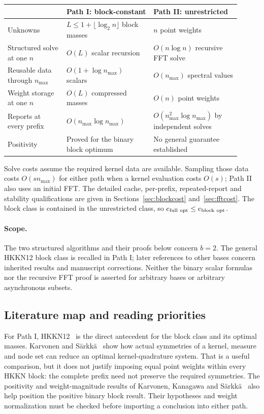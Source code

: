 \documentclass[11pt]{article}
\begin{document}
\begin{center}\small
\begin{tabular}{@{}>{\raggedright\arraybackslash}p{0.23\linewidth}
                  >{\raggedright\arraybackslash}p{0.34\linewidth}
                  >{\raggedright\arraybackslash}p{0.34\linewidth}@{}}
\toprule
 & \textbf{Path I: block-constant} & \textbf{Path II: unrestricted} \\
\midrule
Unknowns & $L\le1+\lfloor\log_2n\rfloor$ block masses & $n$ point weights \\
Structured solve at one $n$ & $O(L)$ scalar recursion & $O(n\log n)$ recursive FFT solve \\
Reusable data through $n_{\max}$ & $O(1+\log n_{\max})$ scalars & $O(n_{\max})$ spectral values \\
Weight storage at one $n$ & $O(L)$ compressed masses & $O(n)$ point weights \\
Reports at every prefix & $O(n_{\max}\log n_{\max})$ & $O(n_{\max}^2\log n_{\max})$ by independent solves \\
Positivity & Proved for the binary block optimum & No general guarantee established \\
\bottomrule
\end{tabular}
\end{center}
Solve costs assume the required kernel data are available. Sampling
those data costs $O(sn_{\max})$ for either path when a kernel evaluation
costs $O(s)$; Path II also uses an initial FFT. The detailed cache,
per-prefix, repeated-report and stability qualifications are given
in Sections~\ref{sec:blockcost} and~\ref{sec:fftcost}.
The block class is contained in the unrestricted class, so
$e_{\rm full\ opt}\le e_{\rm block\ opt}$.

\paragraph{Scope.}
The two structured algorithms and their proofs below concern $b=2$.
The general HKKN12 block class is recalled in Path I; later references
to other bases concern inherited results and manuscript corrections.
Neither the binary scalar formulas nor the recursive FFT proof is
asserted for arbitrary bases or arbitrary asynchronous subsets.

\subsection{Literature map and reading priorities}\label{sec:literature}
For Path I, HKKN12~\cite{HKKN12} is the direct antecedent for the
block class and its optimal masses. Karvonen and S\"arkk\"a~\cite{KS18}
show how actual symmetries of a kernel, measure and node set can
reduce an optimal kernel-quadrature system. That is a useful comparison,
but it does not justify imposing equal point weights within every
HKKN block: the complete prefix need not preserve the required
symmetries. The positivity and weight-magnitude results of Karvonen,
Kanagawa and S\"arkk\"a~\cite{KKS19} also help position the positive
binary block result. Their hypotheses and weight normalization must
be checked before importing a conclusion into either path.
\end{document}
